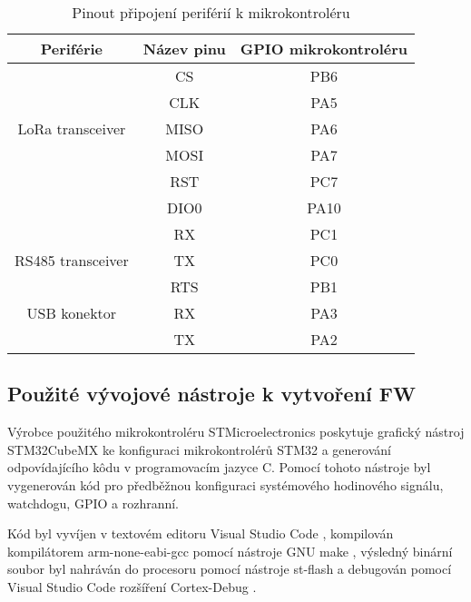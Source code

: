 \begin{table}[!h]
    \centering
    \begin{ctucolortab}
            \begin{tabular}{ |c|c|c| }
     \hline

     Periférie          & Název pinu & GPIO mikrokontroléru           \\ \hline \hline

                        & CS    &  PB6             \\
                        & CLK   &  PA5        \\
    LoRa transceiver    & MISO  &  PA6     \\
                        & MOSI  &  PA7        \\
                        & RST   & PC7          \\
                        & DIO0  & PA10         \\
                        \hline
     
                        & RX  &   PC1            \\
    RS485 transceiver   & TX  &   PC0       \\
                        & RTS  &  PB1      \\     \hline

    USB konektor        & RX    & PA3    \\
                        & TX    & PA2   \\          \hline

    \end{tabular}
    \end{ctucolortab}
    \caption{Pinout připojení periférií k mikrokontroléru}
    \label{table:Pinout připojení periférií k mikrokontroléru}
\end{table}


\subsection{Použité vývojové nástroje k vytvoření FW}
Výrobce použitého mikrokontroléru STMicroelectronics poskytuje grafický nástroj STM32CubeMX \cite{stm32cubemx} ke konfiguraci mikrokontrolérů STM32 a generování odpovídajícího kôdu v programovacím jazyce C.
Pomocí tohoto nástroje byl vygenerován kód pro předběžnou konfiguraci systémového hodinového signálu, watchdogu, GPIO a rozhranní.

Kód byl vyvíjen v textovém editoru Visual Studio Code \cite{vscode}, kompilován kompilátorem arm-none-eabi-gcc \cite{arm-none-eabi-gcc} pomocí nástroje GNU make \cite{makefile}, výsledný binární soubor byl nahráván do procesoru pomocí nástroje st-flash \cite{st-flash} a debugován pomocí Visual Studio Code rozšíření Cortex-Debug \cite{cortex-debug}.



